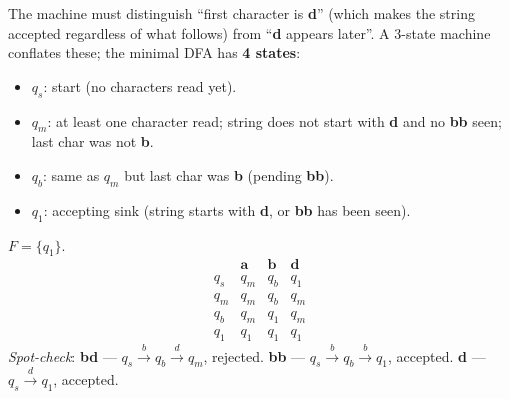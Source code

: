 \documentclass[11pt,openany]{book}
\begin{document}
\begin{enumerate}[{1.}1.]
The machine must distinguish ``first character is \textbf{d}'' (which makes the string accepted regardless of what follows) from ``\textbf{d} appears later''.
A 3-state machine conflates these; the minimal DFA has \textbf{4 states}:

\begin{itemize}
  \item $q_s$: start (no characters read yet).
  \item $q_m$: at least one character read; string does not start with \textbf{d} and no \textbf{bb} seen; last char was not \textbf{b}.
  \item $q_b$: same as $q_m$ but last char was \textbf{b} (pending \textbf{bb}).
  \item $q_1$: accepting sink (string starts with \textbf{d}, or \textbf{bb} has been seen).
\end{itemize}
$F=\{q_1\}$.
\[
\begin{array}{c|ccc}
       & \mathbf{a} & \mathbf{b} & \mathbf{d} \\\hline
q_s    & q_m        & q_b        & q_1        \\
q_m    & q_m        & q_b        & q_m        \\
q_b    & q_m        & q_1        & q_m        \\
q_1    & q_1        & q_1        & q_1
\end{array}
\]
\emph{Spot-check}: \textbf{bd} — $q_s\xrightarrow{b}q_b\xrightarrow{d}q_m$, rejected. \checkmark\quad
\textbf{bb} — $q_s\xrightarrow{b}q_b\xrightarrow{b}q_1$, accepted. \checkmark\quad
\textbf{d} — $q_s\xrightarrow{d}q_1$, accepted. \checkmark

\begin{center}
\end{center}


\end{enumerate}
\end{document}
